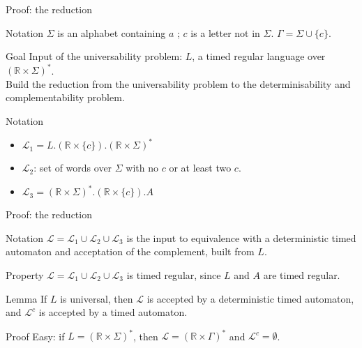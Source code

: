 \begin{frame}{Proof: the reduction}

	\begin{block}{Notation}
	    $\Sigma$ is an alphabet containing $a$ ; $c$ is a letter not in $\Sigma$. $\Gamma = \Sigma \cup \{c\}$.
  	\end{block}

	\begin{block}{Goal}
		Input of the universability problem: $L$, a timed regular language over $(\mathbb{R}\times\Sigma)^*$.\\
		Build the reduction from the universability problem to the determinisability and complementability problem.\\
  	\end{block}

	\begin{block}{Notation}
		\begin{itemize}
			\item $\mathcal{L}_1 = L.(\mathbb{R} \times \{c\}).(\mathbb{R}\times\Sigma)^*$
			\item $\mathcal{L}_2$: set of words over $\Sigma$ with no $c$ or at least two $c$.
			\item $\mathcal{L}_3 = (\mathbb{R}\times\Sigma)^*.(\mathbb{R} \times \{c\}).A$
		\end{itemize}
  	\end{block}

\end{frame}


\begin{frame}{Proof: the reduction}

	\begin{block}{Notation}
		$\mathcal{L} = \mathcal{L}_1 \cup \mathcal{L}_2 \cup \mathcal{L}_3$ is the input to equivalence with a deterministic timed automaton and acceptation of the complement, built from $L$.
	\end{block}

	\begin{block}{Property}
		$\mathcal{L} = \mathcal{L}_1 \cup \mathcal{L}_2 \cup \mathcal{L}_3$ is timed regular, since $L$ and $A$ are timed regular.
	\end{block}

	\begin{block}{Lemma}
		If $L$ is universal, then $\mathcal{L}$ is accepted by a deterministic timed automaton, and $\mathcal{L}^c$ is accepted by a timed automaton.
	\end{block}

	\begin{block}{Proof}
		Easy: if $L = (\mathbb{R}\times\Sigma)^*$, then $\mathcal{L} = (\mathbb{R}\times\Gamma)^*$ and $\mathcal{L}^c = \emptyset$.
	\end{block}

	
\end{frame}


